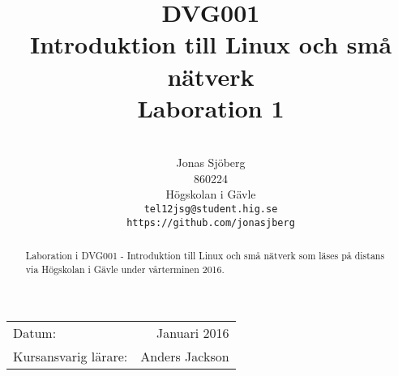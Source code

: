 \documentclass[11pt,a4paper]{article}
\title{DVG001                                  \\ 
       Introduktion till Linux och små nätverk \\ 
       Laboration 1}
\author{                                 \\
  Jonas Sjöberg                          \\
  860224                                 \\
  Högskolan i Gävle                      \\
  \texttt{tel12jsg@student.hig.se}       \\
  \texttt{https://github.com/jonasjberg} \\
}
\date{}
\begin{document}
  \maketitle

  \begin{center}
  \begin{tabular}{l r}
    Datum:               & Januari 2016   \\
    Kursansvarig lärare: & Anders Jackson
  \end{tabular}
  \end{center}

  \begin{abstract}
    Laboration i DVG001 - Introduktion till Linux och små nätverk som läses på distans via Högskolan i Gävle under vårterminen 2016.
  \end{abstract}

  \newpage
  \setcounter{tocdepth}{3}
  \tableofcontents
  \newpage

  
  
% 

  \printbibliography
\end{document}
